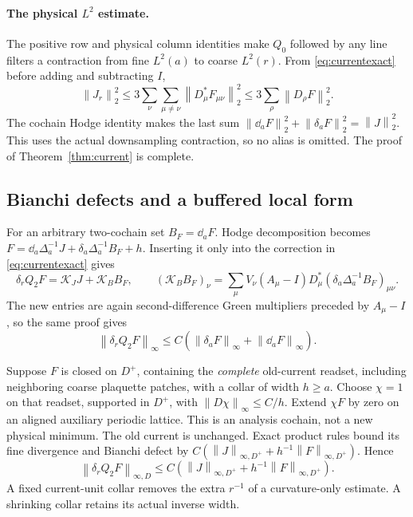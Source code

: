 \documentclass[11pt,letterpaper]{article}
\numberwithin{equation}{section}
\theoremstyle{definition}\newtheorem{definition}[theorem]{Definition}
\theoremstyle{remark}\newtheorem{remark}[theorem]{Remark}
\newcommand{\norm}[1]{\left\lVert #1\right\rVert}
\newcommand{\Kern}{\mathcal K}
\begin{document}
\paragraph{The physical $L^2$ estimate.}
The positive row and physical column identities make $Q_0$ followed by any line filters a contraction from fine $L^2(a)$ to coarse $L^2(r)$. From \eqref{eq:currentexact} before adding and subtracting $I$,
\[
 \norm{J_r}_2^2\le3\sum_\nu\sum_{\mu\ne\nu}
                     \norm{D_\mu^*F_{\mu\nu}}_2^2
 \le3\sum_\rho\norm{D_\rho F}_2^2.
\]
The cochain Hodge identity makes the last sum
$\norm{\dd_aF}_2^2+\norm{\delta_aF}_2^2=\norm J_2^2$.
This uses the actual downsampling contraction, so no alias is omitted. The proof of Theorem~\ref{thm:current} is complete.

\subsection{Bianchi defects and a buffered local form}

For an arbitrary two-cochain set $B_F=\dd_aF$. Hodge decomposition becomes
$F=\dd_a\Delta_a^{-1}J+\delta_a\Delta_a^{-1}B_F+h$.
Inserting it only into the correction in \eqref{eq:currentexact} gives
\[
 \delta_rQ_2F=\Kern_JJ+\Kern_BB_F,\qquad
 (\Kern_BB_F)_\nu=\sum_\mu V_\nu(A_\mu-I)D_\mu^*
                 (\delta_a\Delta_a^{-1}B_F)_{\mu\nu}.
\]
The new entries are again second-difference Green multipliers preceded by $A_\mu-I$, so the same proof gives
\begin{equation}
 \norm{\delta_rQ_2F}_\infty
 \le C(\norm{\delta_aF}_\infty+\norm{\dd_aF}_\infty).
 \label{eq:BianchiDefect}
\end{equation}

Suppose $F$ is closed on $D^+$, containing the \emph{complete} old-current readset, including neighboring coarse plaquette patches, with a collar of width $h\ge a$. Choose $\chi=1$ on that readset, supported in $D^+$, with $\norm{D\chi}_\infty\le C/h$. Extend $\chi F$ by zero on an aligned auxiliary periodic lattice. This is an analysis cochain, not a new physical minimum. The old current is unchanged. Exact product rules bound its fine divergence and Bianchi defect by $C(\norm J_{\infty,D^+}+h^{-1}\norm F_{\infty,D^+})$. Hence
\begin{equation}
 \norm{\delta_rQ_2F}_{\infty,D}
 \le C\left(\norm J_{\infty,D^+}+h^{-1}\norm F_{\infty,D^+}\right).
 \label{eq:localcurrent}
\end{equation}
A fixed current-unit collar removes the extra $r^{-1}$ of a curvature-only estimate. A shrinking collar retains its actual inverse width.
\end{document}
